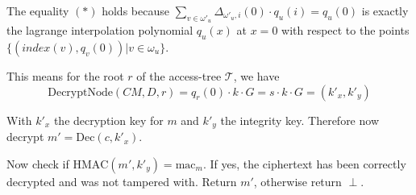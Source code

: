 The equality $(*)$ holds because $\sum_{v \in \omega'_u} \Delta_{\omega'_u, i}(0) \cdot q_u(i) = q_u(0)$ is exactly the lagrange interpolation polynomial $q_u(x)$ at $x = 0$ with respect to the points $\{(index(v), q_v(0)) | v \in \omega_u\}$. 

This means for the root $r$ of the \gls{access-tree} $\mathcal{T}$, we have
\begin{equation*}
    \text{DecryptNode}(CM, D, r) =  q_r(0) \cdot k \cdot G = s \cdot k \cdot G = (k'_x, k'_y)
\end{equation*}

With $k'_x$ the decryption key for $m$ and $k'_y$ the integrity key. Therefore now decrypt $m' = \text{Dec}(c, k'_x)$.

Now check if $\text{HMAC}(m', k'_y) = \text{mac}_m$. If yes, the ciphertext has been correctly decrypted and was not tampered with. Return $m'$, otherwise return $\perp$.